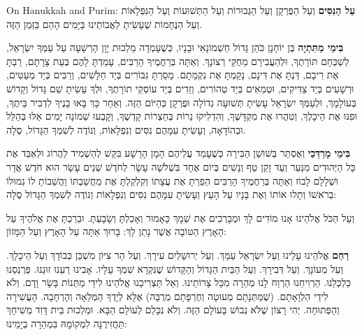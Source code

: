 \begin{seasonal}{On Hanukkah and Purim:}
\textbf{עַל הַנִּסִּים} וְעַל הַפֻּרְקָן וְעַל הַגְּבוּרוֹת וְעַל הַתְּשׁוּעוֹת וְעַל הַנִּפְלָאוֹת וְעַל הַנֶּחָמוֹת שֶׁעָשִׂיתָ לַאֲבוֹתֵינוּ בַּיָּמִים הָהֵם בַּזְּמַן הַזֶּה.

\textbf{בִּימֵי מַתִּתְיָה} בֶּן יוֹחָנָן כֹּהֵן גָּדוֹל חַשְׁמוֹנָאִי וּבָנָיו, כְּשֶׁעָמְדָה מַלְכוּת יָוָן הָרְשָׁעָה עַל עַמְּךָ יִשְׂרָאֵל, לְשַׁכְּחָם תּוֹרָתֶךָ, וּלְהַעֲבִירָם מֵחֻקֵּי רְצוֹנָךְ. וְאַתָּה בְּרַחֲמֶיךָ הָרַבִּים, עָמַדְתָּ לָהֶם בְּעֵת צָרָתָם, רַבְתָּ אֶת רִיבָם, דַּנְתָּ אֶת דִּינָם, נָקַמְתָּ אֶת נִקְמָתָם. מָסַרְתָּ גִבּוֹרִים בְּיַד חַלָּשִׁים, וְרַבִּים בְּיַד מְעַטִּים, וּרְשָׁעִים בְּיַד צַדִּיקִים, וּטְמֵאִים בְּיַד טְהוֹרִים, וְזֵדִים בְּיַד עוֹסְקֵי תוֹרָתֶךָ, וּלְךָ עָשִׂיתָ שֵׁם גָּדוֹל וְקָדוֹשׁ בְּעוֹלָמָךְ, וּלְעַמְּךָ יִשְׂרָאֵל עָשִׂיתָ תְּשׁוּעָה גְדוֹלָה וּפֻרְקָן כְּהַיּוֹם הַזֶּה. וְאַחַר כָּךְ בָּאוּ בָנֶיךָ לִדְבִיר בֵּיתֶךָ, וּפִנּוּ אֶת הֵיכָלֶךָ, וְטִהֲרוּ אֶת מִקְדָּשֶׁךָ, וְהִדְלִיקוּ נֵרוֹת בְּחַצְרוֹת קָדְשֶׁךָ, וְקָבְעוּ שְׁמוֹנָה יָמִים אֵלּוּ בְּהַלֵּל וּבְהוֹדָאָה, וְעָשִׂיתָ עִמָּהֶם נִסִּים וְנִפְלָאוֹת, וְנוֹדֶה לְשִׁמְךָ הַגָּדוֹל, סֶלָה.

\textbf{בִּימֵי מָרְדְּכַי} וְאֶסְתֵּר בְּשׁוּשַׁן הַבִּירָה כְּשֶׁעָמַד עֲלֵיהֶם הָמָן הָרָשָׁע בִּקֵּשׁ לְהַשְׁמִיד לַהֲרוֹג וּלְאַבֵּד אֶת כָּל הַיְּהוּדִים מִנַּעַר וְעַד זָקֵן טַף וְנָשִׁים בְּיוֹם אֶחָד בִּשְׁלֹשָׁה עָשָׂר לְחֹדֶשׁ שְׁנֵים עָשָׂר הוּא חֹדֶשׁ אֲדָר וּשְׁלָלָם לָבוֹז וְאַתָּה בְּרַחֲמֶיךָ הָרַבִּים הֵפַרְתָּ אֶת עֲצָתוֹ וְקִלְקַלְתָּ אֶת מַחֲשַׁבְתּוֹ וַהֲשֵׁבוֹתָ לוֹ גְמוּלוֹ בְרֹאשׁוֹ וְתָלוּ אוֹתוֹ וְאֶת בָּנָיו עַל הָעֵץ וְעָשִׂיתָ עִמָּהֶם נִסִּים וְנִפְלָאוֹת וְנוֹדֶה לְשִׁמְךָ הַגָּדוֹל סֶלָה:
\end{seasonal}

וְעַל הַכֹּל \Shem{} אֱלֹהֵינוּ אָנוּ מוֹדִים לָךְ וּמְבָרְכִים אֶת שְׁמָךְ כָּאָמוּר וְאָכַלְתָּ וְשָׂבָעְתָּ. וּבֵרַכְתָּ אֶת \Shem{} אֱלֹהֶיךָ עַל הָאָרֶץ הַטּוֹבָה אֲשֶׁר נָתַן לָךְ: בָּרוּךְ אַתָּה \Shem{} עַל הָאָרֶץ וְעַל הַמָּזוֹן:

\textbf{רַחֵם} \Shem{} אֱלֹהֵינוּ עָלֵינוּ וְעַל יִשְׂרָאֵל עַמָּךְ. וְעַל יְרוּשָׁלַיִם עִירָךְ. וְעַל הַר צִיּוֹן מִשְׁכַּן כְּבוֹדָךְ וְעַל הֵיכָלָךְ. וְעַל מְעוֹנָךְ. וְעַל דְּבִירָךְ. וְעַל הַבַּיִת הַגָּדוֹל וְהַקָּדוֹשׁ שֶׁנִּקְרָא שִׁמְךָ עָלָיו. אָבִינוּ רְעֵנוּ זוּנֵנוּ. פַּרְנְסֵנוּ כַּלְכְּלֵנוּ. הַרְוִיחֵנוּ הַרְוַח לָנוּ מְהֵרָה מִכָּל צָרוֹתֵינוּ. וְאַל תַּצְרִיכֵנוּ \Shem{} אֱלֹהֵינוּ לִידֵי מַתְּנוֹת בָּשָׂר וָדָם. וְלֹא לִידֵי הַלְוָאָתָם. (שֶׁמַּתְּנָתָם מְעוּטָה וְחֶרְפָּתָם מְרֻבָּה) אֶלָּא לְיָדְךָ הַמְּלֵאָה וְהָרְחָבָה. הָעֲשִׁירָה וְהַפְּתוּחָה. יְהִי רָצוֹן שֶׁלֹּא נֵבוֹשׁ בָּעוֹלָם הַזֶּה. וְלֹא נִכָּלֵם לְעוֹלָם הַבָּא. וּמַלְכוּת בֵּית דָּוִד מְשִׁיחָךְ תַּחֲזִירֶנָּה לִמְקוֹמָהּ בִּמְהֵרָה בְיָמֵינוּ:


